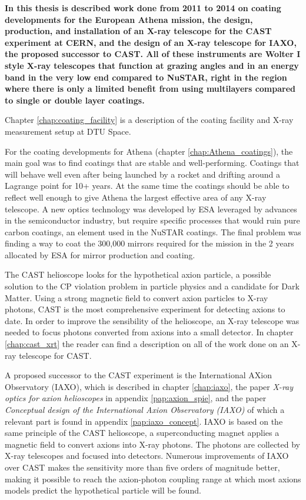 {\bf In this thesis is described work done from 2011 to 2014 on coating developments for the European Athena mission, the design, production, and installation of an X-ray telescope for the CAST experiment at CERN, and the design of an X-ray telescope for IAXO, the proposed successor to CAST. All of these instruments are Wolter I style X-ray telescopes that function at grazing angles and in an energy band in the very low end compared to NuSTAR, right in the region where there is only a limited benefit from using multilayers compared to single or double layer coatings. }

Chapter \ref{chap:coating_facility} is a description of the coating facility and X-ray measurement setup at DTU Space. %

For the coating developments for Athena (chapter \ref{chap:Athena_coatings}), the main goal was to find coatings that are stable and well-performing. Coatings that will behave well even after being launched by a rocket and drifting around a Lagrange point for 10+ years. At the same time the coatings should be able to reflect well enough to give Athena the largest effective area of any X-ray telescope. A new optics technology was developed by ESA leveraged by advances in the semiconductor industry, but require specific processes that would ruin pure carbon coatings, an element used in the NuSTAR coatings. The final problem was finding a way to coat the 300,000 mirrors required for the mission in the 2 years allocated by ESA for mirror production and coating.

The CAST helioscope looks for the hypothetical axion particle, a possible solution to the CP violation problem in particle physics and a candidate for Dark Matter. Using a strong magnetic field to convert axion particles to X-ray photons, CAST is the most comprehensive experiment for detecting axions to date. In order to improve the sensibility of the helioscope, an X-ray telescope was needed to focus photons converted from axions into a small detector. In chapter \ref{chap:cast_xrt} the reader can find a description on all of the work done on an X-ray telescope for CAST.

A proposed successor to the CAST experiment is the International AXion Observatory (IAXO), which is described in chapter \ref{chap:iaxo}, the paper \emph{X-ray optics for axion helioscopes} in appendix \ref{pap:axion_spie}, and the paper \emph{Conceptual design of the International Axion Observatory (IAXO)} of which a relevant part is found in appendix \ref{pap:iaxo_concept}. IAXO is based on the same principle of the CAST helioscope, a superconducting magnet applies a magnetic field to convert axions into X-ray photons. The photons are collected by X-ray telescopes and focused into detectors. Numerous improvements of IAXO over CAST makes the sensitivity more than five orders of magnitude better, making it possible to reach the axion-photon coupling range at which most axions models predict the hypothetical particle will be found.

